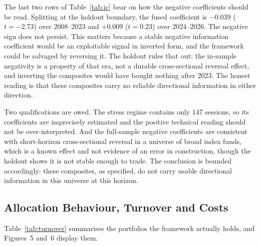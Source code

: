 \documentclass{singlecol-new}
\theoremstyle{TH}{
\newtheorem{lemma}{Lemma}
\newtheorem{theorem}[lemma]{Theorem}
\newtheorem{corrolary}[lemma]{Corrolary}
\newtheorem{conjecture}[lemma]{Conjecture}
\newtheorem{proposition}[lemma]{Proposition}
\newtheorem{claim}[lemma]{Claim}
\newtheorem{stheorem}[lemma]{Wrong Theorem}
\newtheorem{algorithm}{Algorithm}
}
\theoremstyle{THrm}{
\newtheorem{definition}{Definition}[section]
\newtheorem{question}{Question}[section]
\newtheorem{remark}{Remark}
\newtheorem{scheme}{Scheme}
}
\theoremstyle{THhit}{
\newtheorem{case}{Case}[section]
}
\begin{document}
The last two rows of Table~\ref{tab:ic} bear on how the negative coefficients should be
read. Splitting at the holdout boundary, the fused coefficient is $-0.039$ ($t = -2.73$)
over 2008--2023 and $+0.009$ ($t = 0.23$) over 2024--2026. The negative sign does not
persist. This matters because a stable negative information coefficient would be an
exploitable signal in inverted form, and the framework could be salvaged by reversing it.
The holdout rules that out: the in-sample negativity is a property of that era, not a
durable cross-sectional reversal effect, and inverting the composites would have bought
nothing after 2023. The honest reading is that these composites carry no reliable
directional information in either direction.

Two qualifications are owed. The stress regime contains only 147 sessions, so its
coefficients are imprecisely estimated and the positive technical reading should not be
over-interpreted. And the full-sample negative coefficients are consistent with
short-horizon cross-sectional reversal in a universe of broad index funds, which is a
known effect and not evidence of an error in construction, though the holdout shows it is
not stable enough to trade. The conclusion is bounded accordingly: these composites, as
specified, do not carry usable directional information in this universe at this
horizon.

\subsection{Allocation Behaviour, Turnover and Costs}
\label{sec:alloc}
\label{sec:cost}

Table~\ref{tab:turnover} summarises the portfolios the framework actually holds, and Figures~5 and~6
display them.
\end{document}
